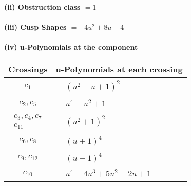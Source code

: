 \documentclass[1p]{elsarticle_modified}
\theoremstyle{definition}
\begin{document}
\flushleft \textbf{(ii) Obstruction class $= 1$}\\~\\
\flushleft \textbf{(iii) Cusp Shapes $= -4 u^2+8 u+4$}\\~\\
\newpage\renewcommand{\arraystretch}{1}
\flushleft \textbf{(iv) u-Polynomials at the component}\newline \\
\begin{tabular}{m{50pt}|m{274pt}}
Crossings & \hspace{64pt}u-Polynomials at each crossing \\
\hline $$\begin{aligned}c_{1}\end{aligned}$$&$\begin{aligned}
&(u^2- u+1)^2
\end{aligned}$\\
\hline $$\begin{aligned}c_{2},c_{5}\end{aligned}$$&$\begin{aligned}
&u^4- u^2+1
\end{aligned}$\\
\hline $$\begin{aligned}c_{3},c_{4},c_{7}\\c_{11}\end{aligned}$$&$\begin{aligned}
&(u^2+1)^2
\end{aligned}$\\
\hline $$\begin{aligned}c_{6},c_{8}\end{aligned}$$&$\begin{aligned}
&(u+1)^4
\end{aligned}$\\
\hline $$\begin{aligned}c_{9},c_{12}\end{aligned}$$&$\begin{aligned}
&(u-1)^4
\end{aligned}$\\
\hline $$\begin{aligned}c_{10}\end{aligned}$$&$\begin{aligned}
&u^4-4 u^3+5 u^2-2 u+1
\end{aligned}$\\
\hline
\end{tabular}\\~\\
\end{document}
